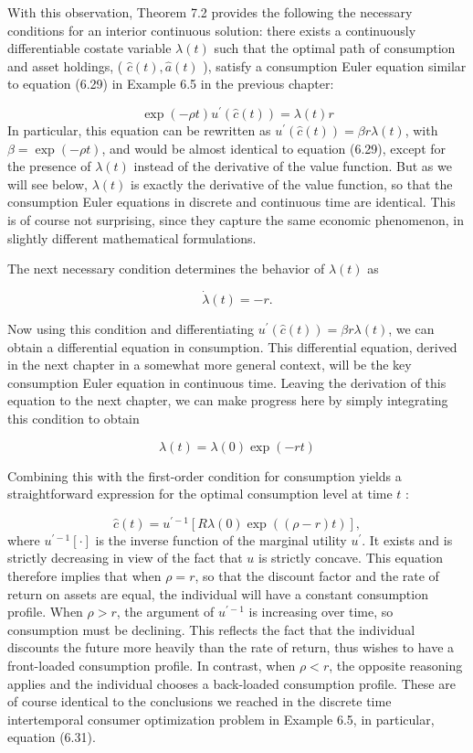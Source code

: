\documentclass[\topdir/lecture_notes.tex]{subfiles}
\begin{document}
With this observation, Theorem 7.2 provides the following the necessary conditions for an interior continuous solution: there exists a continuously differentiable costate variable $\lambda(t)$ such that the optimal path of consumption and asset holdings, ( $\hat{c}(t), \hat{a}(t)$ ), satisfy a consumption Euler equation similar to equation (6.29) in Example 6.5 in the previous chapter:

\[
\exp (-\rho t) u^{\prime}(\hat{c}(t))=\lambda(t) r
\]
In particular, this equation can be rewritten as $u^{\prime}(\hat{c}(t))=\beta r \lambda(t)$, with $\beta=\exp (-\rho t)$, and would be almost identical to equation (6.29), except for the presence of $\lambda(t)$ instead of the derivative of the value function. But as we will see below, $\lambda(t)$ is exactly the derivative of the value function, so that the consumption Euler equations in discrete and continuous time are identical. This is of course not surprising, since they capture the same economic phenomenon, in slightly different mathematical formulations.

The next necessary condition determines the behavior of $\lambda(t)$ as

\[
\dot{\lambda}(t)=-r .
\]

Now using this condition and differentiating $u^{\prime}(\hat{c}(t))=\beta r \lambda(t)$, we can obtain a differential equation in consumption. This differential equation, derived in the next chapter in a somewhat more general context, will be the key consumption Euler equation in continuous time. Leaving the derivation of this equation to the next chapter, we can make progress here by simply integrating this condition to obtain

\[
\lambda(t)=\lambda(0) \exp (-r t)
\]

Combining this with the first-order condition for consumption yields a straightforward expression for the optimal consumption level at time $t$ :

\[
\hat{c}(t)=u^{\prime-1}[R \lambda(0) \exp ((\rho-r) t)],
\]
where $u^{\prime-1}[\cdot]$ is the inverse function of the marginal utility $u^{\prime}$. It exists and is strictly decreasing in view of the fact that $u$ is strictly concave. This equation therefore implies that when $\rho=r$, so that the discount factor and the rate of return on assets are equal, the individual will have a constant consumption profile. When $\rho>r$, the argument of $u^{\prime-1}$ is increasing over time, so consumption must be declining. This reflects the fact that the individual discounts the future more heavily than the rate of return, thus wishes to have a\\
front-loaded consumption profile. In contrast, when $\rho<r$, the opposite reasoning applies and the individual chooses a back-loaded consumption profile. These are of course identical to the conclusions we reached in the discrete time intertemporal consumer optimization problem in Example 6.5, in particular, equation (6.31).
\end{document}
